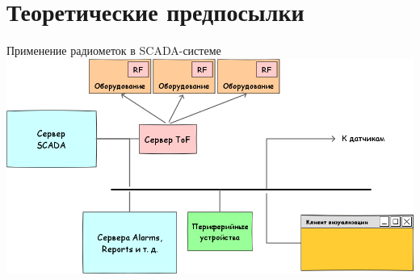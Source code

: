 \section{Теоретические предпосылки}

\begin{frame}{Применение радиометок в SCADA-системе}
    \centering
    \includegraphics[width=1\linewidth]{../Figures/scada.png}
\end{frame}

